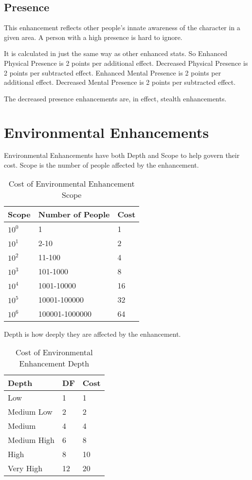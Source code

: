 \subsection{Presence}

This enhancement reflects other people's innate awareness of the character
in a given area. A person with a high presence is hard to ignore.

It is calculated in just the same way as other enhanced stats. So
Enhanced Physical Presence is 2 points per additional effect.
Decreased Physical Presence is 2 points per subtracted effect.
Enhanced Mental Presence is 2 points per additional effect.
Decreased Mental Presence is 2 points per subtracted effect.

The decreased presence enhancements are, in effect, stealth enhancements.

\section{Environmental Enhancements}

Environmental Enhancements have both Depth and Scope to help govern
their cost. Scope is the number of people affected by the enhancement.

\begin{table}
	\begin{tabular}{lll}
    Scope & Number of People & Cost \\
\hline
	$ 10^0 $ & 1            & 1 \\
	$ 10^1 $ & 2-10         & 2 \\
	$ 10^2 $ & 11-100       & 4 \\
	$ 10^3 $ & 101-1000     & 8 \\
	$ 10^4 $ & 1001-10000   & 16 \\
	$ 10^5 $ & 10001-100000 & 32 \\
	$ 10^6 $ & 100001-1000000 & 64 \\	
	\end{tabular}
    \caption{Cost of Environmental Enhancement Scope}\label{Table:EnvironmentalEnhancementScopeCosts}
\end{table}

Depth is how deeply they are affected by the enhancement.

\begin{table}
	\begin{tabular}{lll}
    Depth & DF & Cost \\
\hline
	Low         & 1 & 1 \\
	Medium Low  & 2 & 2 \\
	Medium      & 4 & 4 \\
	Medium High & 6 & 8 \\
	High        & 8 & 10 \\
	Very High   & 12 & 20 \\
	\end{tabular}
    \caption{Cost of Environmental Enhancement Depth}\label{Table:EnvironmentalEnhancementDepthCosts}
\end{table}

